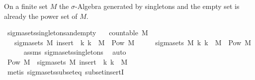 \begin{isabellebody}
\endisatagproof
{\isafoldproof}%
%
\isadelimproof
%
\endisadelimproof
%
\begin{isamarkuptext}%
On a finite set $M$ the $\sigma$-Algebra generated by singletons and the empty set
is already the power set of $M$.%
\end{isamarkuptext}\isamarkuptrue%
\isamarkupfalse%
\ sigma{\isacharunderscore}{\kern0pt}sets{\isacharunderscore}{\kern0pt}singletons{\isacharunderscore}{\kern0pt}and{\isacharunderscore}{\kern0pt}empty{\isacharcolon}{\kern0pt}\isanewline
\ \ \ {\isachardoublequoteopen}countable\ M{\isachardoublequoteclose}\isanewline
\ \ \ {\isachardoublequoteopen}sigma{\isacharunderscore}{\kern0pt}sets\ M\ {\isacharparenleft}{\kern0pt}insert\ {\isacharbraceleft}{\kern0pt}{\isacharbraceright}{\kern0pt}\ {\isacharparenleft}{\kern0pt}{\isacharparenleft}{\kern0pt}{\isasymlambda}k{\isachardot}{\kern0pt}\ {\isacharbraceleft}{\kern0pt}k{\isacharbraceright}{\kern0pt}{\isacharparenright}{\kern0pt}\ {\isacharbackquote}{\kern0pt}\ M{\isacharparenright}{\kern0pt}{\isacharparenright}{\kern0pt}\ {\isacharequal}{\kern0pt}\ Pow\ M{\isachardoublequoteclose}\isanewline
%
\isadelimproof
%
\endisadelimproof
%
\isatagproof
{}\isamarkupfalse%
\ {\isacharminus}{\kern0pt}\isanewline
\ \ \isamarkupfalse%
\ {\isachardoublequoteopen}sigma{\isacharunderscore}{\kern0pt}sets\ M\ {\isacharparenleft}{\kern0pt}{\isacharparenleft}{\kern0pt}{\isasymlambda}k{\isachardot}{\kern0pt}\ {\isacharbraceleft}{\kern0pt}k{\isacharbraceright}{\kern0pt}{\isacharparenright}{\kern0pt}\ {\isacharbackquote}{\kern0pt}\ M{\isacharparenright}{\kern0pt}\ {\isacharequal}{\kern0pt}\ Pow\ M{\isachardoublequoteclose}\isanewline
\ \ \ \ \isamarkupfalse%
\ assms\ sigma{\isacharunderscore}{\kern0pt}sets{\isacharunderscore}{\kern0pt}singletons\ \isamarkupfalse%
\ auto\isanewline
\ \ \isamarkupfalse%
\ {\isachardoublequoteopen}Pow\ M\ {\isasymsubseteq}\ sigma{\isacharunderscore}{\kern0pt}sets\ M\ {\isacharparenleft}{\kern0pt}insert\ {\isacharbraceleft}{\kern0pt}{\isacharbraceright}{\kern0pt}\ {\isacharparenleft}{\kern0pt}{\isacharparenleft}{\kern0pt}{\isasymlambda}k{\isachardot}{\kern0pt}\ {\isacharbraceleft}{\kern0pt}k{\isacharbraceright}{\kern0pt}{\isacharparenright}{\kern0pt}\ {\isacharbackquote}{\kern0pt}\ M{\isacharparenright}{\kern0pt}{\isacharparenright}{\kern0pt}{\isachardoublequoteclose}\isanewline
\ \ \ \ \isamarkupfalse%
\ {\isacharparenleft}{\kern0pt}metis\ sigma{\isacharunderscore}{\kern0pt}sets{\isacharunderscore}{\kern0pt}subseteq\ subset{\isacharunderscore}{\kern0pt}insertI{\isacharparenright}{\kern0pt}\isanewline

\end{isabellebody}
